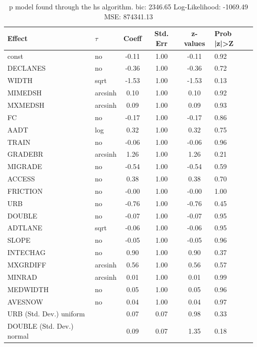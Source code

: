 \begin{table}
	\caption{p model found through the hs algorithm. bic: 2346.65 Log-Likelihood: -1069.49 MSE: 874341.13}
	\begin{center}
		\begin{tabular}{|l|l|c|c|c|l|}
			\hline
			Effect & $\tau$ & Coeff & Std. Err & z-values & Prob |z|>Z \\
			\hline
			const & no & -0.11 & 1.00 & -0.11 & 0.92 \\
			\hline
			DECLANES & no & -0.36 & 1.00 & -0.36 & 0.72 \\
			\hline
			WIDTH & sqrt & -1.53 & 1.00 & -1.53 & 0.13 \\
			\hline
			MIMEDSH & arcsinh & 0.10 & 1.00 & 0.10 & 0.92 \\
			\hline
			MXMEDSH & arcsinh & 0.09 & 1.00 & 0.09 & 0.93 \\
			\hline
			FC & no & -0.17 & 1.00 & -0.17 & 0.86 \\
			\hline
			AADT & log & 0.32 & 1.00 & 0.32 & 0.75 \\
			\hline
			TRAIN & no & -0.06 & 1.00 & -0.06 & 0.96 \\
			\hline
			GRADEBR & arcsinh & 1.26 & 1.00 & 1.26 & 0.21 \\
			\hline
			MIGRADE & no & -0.54 & 1.00 & -0.54 & 0.59 \\
			\hline
			ACCESS & no & 0.38 & 1.00 & 0.38 & 0.70 \\
			\hline
			FRICTION & no & -0.00 & 1.00 & -0.00 & 1.00 \\
			\hline
			URB & no & -0.76 & 1.00 & -0.76 & 0.45 \\
			\hline
			DOUBLE & no & -0.07 & 1.00 & -0.07 & 0.95 \\
			\hline
			ADTLANE & sqrt & -0.06 & 1.00 & -0.06 & 0.95 \\
			\hline
			SLOPE & no & -0.05 & 1.00 & -0.05 & 0.96 \\
			\hline
			INTECHAG & no & 0.90 & 1.00 & 0.90 & 0.37 \\
			\hline
			MXGRDIFF & arcsinh & 0.56 & 1.00 & 0.56 & 0.57 \\
			\hline
			MINRAD & arcsinh & 0.01 & 1.00 & 0.01 & 0.99 \\
			\hline
			MEDWIDTH & no & 0.05 & 1.00 & 0.05 & 0.96 \\
			\hline
			AVESNOW & no & 0.04 & 1.00 & 0.04 & 0.97 \\
			\hline
			URB (Std. Dev.) uniform &  & 0.07 & 0.07 & 0.98 & 0.33 \\
			\hline
			DOUBLE (Std. Dev.) normal &  & 0.09 & 0.07 & 1.35 & 0.18 \\

\end{tabular}
\end{center}
\end{table}
